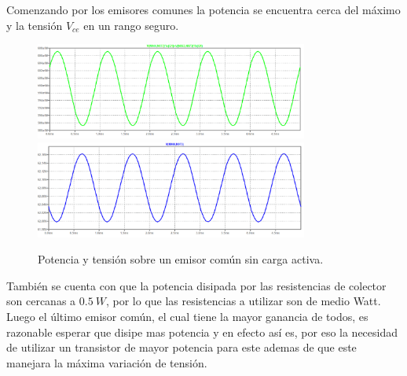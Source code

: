 Comenzando por los emisores comunes la potencia se encuentra cerca del máximo y la tensión $V_{ce}$ en un rango seguro.

\begin{figure}[H]
	\centering
	\includegraphics[width=0.8\textwidth]{ImagenesSimulaciones/PEC1.png}
		\includegraphics[width=0.8\textwidth]{ImagenesSimulaciones/VEC1.png}
	\caption{Potencia y tensión sobre un emisor común sin carga activa.}
	\label{fig:pec1}
\end{figure}

También se cuenta con que la potencia disipada por las resistencias de colector son cercanas a $0.5 \ W$, por lo que las resistencias a utilizar son de medio Watt. Luego el último emisor común, el cual tiene la mayor ganancia de todos, es razonable esperar que disipe mas potencia y en efecto así es, por eso la necesidad de utilizar un transistor de mayor potencia para este ademas de que este manejara la máxima variación de tensión.

